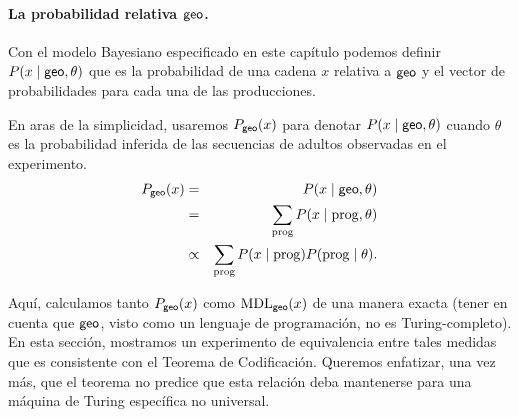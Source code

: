 
\paragraph{La probabilidad relativa ${\sf geo}$.} 

Con el modelo Bayesiano especificado en este capítulo podemos definir $P(x \mid {\sf geo}, \theta)$ que es la probabilidad de una cadena $x$ relativa a ${\sf geo}$ y el vector de probabilidades para cada una de las producciones.

En aras de la simplicidad, usaremos $P_{{\sf geo}}(x)$ para denotar $P(x \mid {\sf geo}, \theta)$ cuando $\theta$ es la probabilidad inferida de las secuencias de adultos observadas en el experimento.
%
\begin{eqnarray*}
\label{eqG}
P_{{\sf geo}}(x) &=& P(x \mid {\sf geo}, \theta)\\
&=& \sum_{{\rm prog}} P(x \mid {\rm prog}, \theta)\\
&\propto &\sum_{{\rm prog}} P(x \mid {\rm prog}) P({\rm prog} \mid \theta).
\end{eqnarray*}
%


Aquí, calculamos tanto $P_{{\sf geo}}(x)$ como ${\rm MDL}_{{\sf geo}}(x)$ de una manera exacta (tener en cuenta que ${\sf geo}$, visto como un lenguaje de programación, no es Turing-completo). En esta sección, mostramos un experimento de equivalencia entre tales medidas que es consistente con el Teorema de Codificación. Queremos enfatizar, una vez más, que el teorema no predice que esta relación deba mantenerse para una máquina de Turing específica no universal.


